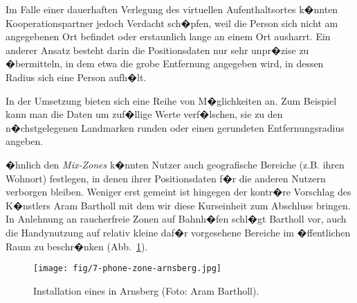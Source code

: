 
Im Falle einer dauerhaften Verlegung des virtuellen Aufenthaltsortes k�nnten Kooperationspartner jedoch Verdacht sch�pfen, weil die Person sich nicht am angegebenen Ort befindet oder erstaunlich lange an einem Ort ausharrt. Ein anderer Ansatz besteht darin die Positionsdaten nur sehr unpr�zise zu �bermitteln, in dem etwa die grobe Entfernung angegeben wird, in dessen Radius sich eine Person aufh�lt. 
\newpage
{}

In der Umsetzung bieten sich eine Reihe von M�glichkeiten an. Zum Beispiel kann man die Daten um zuf�llige Werte verf�lschen, sie zu den n�chstgelegenen Landmarken runden oder einen gerundeten Entfernungsradius angeben. 

�hnlich den \textit{Mix-Zones} k�nnten Nutzer auch geografische Bereiche (z.B. ihren Wohnort) festlegen, in denen ihrer Positionsdaten f�r die anderen Nutzern verborgen bleiben. Weniger erst gemeint ist hingegen der kontr�re Vorschlag des K�nstlers Aram Bartholl mit dem wir diese Kurseinheit zum Abschluss bringen. In Anlehnung an raucherfreie Zonen auf Bahnh�fen schl�gt Bartholl vor, auch die Handynutzung auf relativ kleine daf�r vorgesehene Bereiche im �ffentlichen Raum zu beschr�nken (Abb.~\ref{phone-zone}). 

\begin{figure}
  \texttt{[image: fig/7-phone-zone-arnsberg.jpg]}\\
  \caption{Installation eines  in Arnsberg (Foto: Aram Bartholl).}
\label{phone-zone}
\end{figure}

















